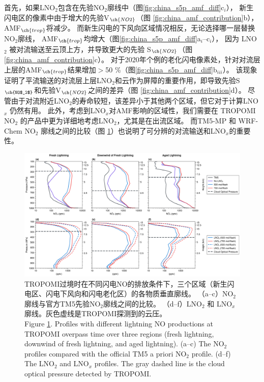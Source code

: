 首先，如果LNO$_2$包含在先验NO$_2$廓线中（图\ref{fig:china_s5p_amf_diff}c$_i$），
新生闪电区的像素中由于增大的先验V$_{\ch{NO2}}$（图 \ref{fig:china_amf_contribution}b），AMF$_{\ch{trop}}$将减少。
而新生闪电的下风向区域情况相反，无论选择哪一层替换NO$_2$廓线，
AMF$_{\ch{trop}}$均增大（图\ref{fig:china_s5p_amf_diff}a$_{i}$--c$_{i}$），
因为 LNO $_2$ 被对流输送至云顶上方，并导致更大的先验 S$_{\ch{NO2}}$（图 \ref{fig:china_amf_contribution}c）。
对于2020年个例的老化闪电像素处，针对对流层上层的AMF$_{\ch{trop}}$结果增加$>$50 \%（图\ref{fig:china_s5p_amf_diff}b$_{iii}$）。
该现象证明了平流输送的对流层上层LNO$_2$和云作为屏障的重要作用，即导致先验S$_{\ch{NO$_2$}}$和先验V$_{\ch{NO2}}$之间的差异（图 \ref{fig:china_amf_contribution}d）。
尽管由于对流附近LNO$_2$的寿命较短，该差异小于其他两个区域，但它对于计算LNO$_x$ 仍然有用。
此外，考虑到LNO$_x$对AMF影响的区域性，我们需要在 TROPOMI NO$_2$ 的产品中更为详细地考虑LNO$_2$，尤其是在出流区域。
而TM5-MP 和 WRF-Chem NO$_2$ 廓线之间的比较（图 \ref{fig:china_nox_profile}）也说明了可分辨的对流输送和LNO$_x$的重要性。


\begin{figure}[H]
    \includegraphics[width=16cm]{./figures/china_nox_profile.png}
    \caption{
    TROPOMI过境时在不同闪电NO的排放条件下，三个区域（新生闪电区、闪电下风向和闪电老化区）的各物质垂直廓线。
    （a--c）NO$_2$廓线与官方TM5先验NO$_2$廓线之间的比较。
    （d--f）LNO$_2$ 和 LNO$_x$廓线。灰色虚线是TROPOMI探测到的云压。\\
     Figure \ref{fig:china_nox_profile}. Profiles with different lightning NO productions at TROPOMI overpass time over three regions (fresh lightning, downwind of fresh lightning, and aged lightning).
    (a--c) The NO$_2$ profiles compared with the official TM5 a priori NO$_2$ profile.
    (d--f) The LNO$_2$ and LNO$_x$ profiles.
    The gray dashed line is the cloud optical pressure detected by TROPOMI.
    }
    \label{fig:china_nox_profile}
\end{figure}


